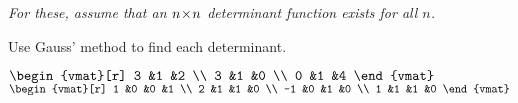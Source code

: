 \begin{exercises}
  \item[{\em For these, assume that an $n \! \times \! n$ determinant
      function exists for all $n$.}]
  \recommended \item 
    Use Gauss' method to find each determinant.
    \begin{exparts*}
      \partsitem \( \begin{vmat}[r]
                 3  &1  &2  \\
                 3  &1  &0  \\
                 0  &1  &4
               \end{vmat} \)
      \partsitem \( \begin{vmat}[r]
                 1  &0  &0  &1 \\
                 2  &1  &1  &0 \\
                -1  &0  &1  &0 \\
                 1  &1  &1  &0
               \end{vmat} \)
    \end{exparts*}
    \begin{answer}
\end{answer}
\end{exercises}
